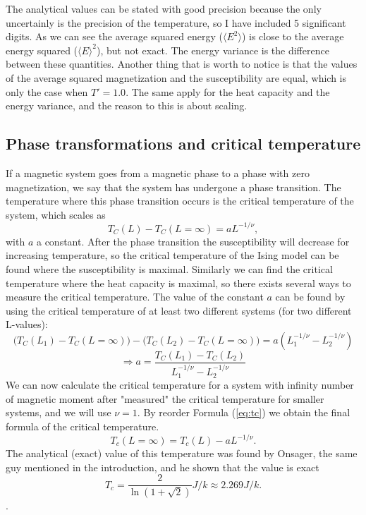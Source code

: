 \documentclass[norsk,a4paper,12pt]{article}
\begin{document}
The analytical values can be stated with good precision because the only uncertainly is the precision of the temperature, so I have included 5 significant digits. As we can see the average squared energy ($\langle E^2\rangle$) is close to the average energy squared ($\langle E\rangle^2$), but not exact. The energy variance is the difference between these quantities. Another thing that is worth to notice is that the values of the average squared magnetization and the susceptibility are equal, which is only the case when $T'=1.0$. The same apply for the heat capacity and the energy variance, and the reason to this is about scaling.

\subsection{Phase transformations and critical temperature}
If a magnetic system goes from a magnetic phase to a phase with zero magnetization, we say that the system has undergone a phase transition. The temperature where this phase transition occurs is the critical temperature of the system, which scales as
\begin{equation}
 T_C(L)-T_C(L=\infty) = aL^{-1/\nu},
 \label{eq:tc}
\end{equation}
with  $a$ a constant. After the phase transition the susceptibility will decrease for increasing temperature, so the critical temperature of the Ising model can be found where the susceptibility is maximal. Similarly we can find the critical temperature where the heat capacity is maximal, so there exists several ways to measure the critical temperature. The value of the constant $a$ can be found by using the critical temperature of at least two different systems (for two different L-values):
\begin{equation*}
\Big(T_C(L_1)-T_C(L=\infty)\Big)-\Big(T_C(L_2)-T_C(L=\infty)\Big)=a(L_1^{-1/\nu}-L_2^{-1/\nu})
\end{equation*}
\begin{equation}
\Rightarrow a=\frac{T_C(L_1)-T_C(L_2)}{L_1^{-1/\nu}-L_2^{-1/\nu}}
\label{eq:a}
\end{equation}
We can now calculate the critical temperature for a system with infinity number of magnetic moment after "measured" the critical temperature for smaller systems, and we will use $\nu=1$.  By reorder Formula (\ref{eq:tc}) we obtain the final formula of the critical temperature.
\begin{equation}
T_c(L=\infty)=T_c(L)-aL^{-1/\nu}.
\label{eq:critical}
\end{equation}
The analytical (exact) value of this temperature was found by Onsager, the same guy mentioned in the introduction, and he shown that the value is exact
\begin{equation}
T_c=\frac{2}{\ln(1+\sqrt{2})}J/k\approx 2.269 J/k.
\end{equation}
\cite{Project_text}. 
\end{document}
